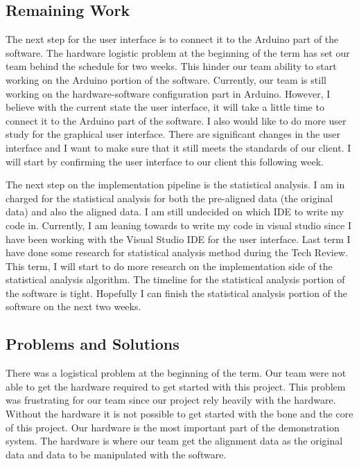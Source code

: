 \subsection{Remaining Work}
The next step for the user interface is to connect it to the Arduino part of the software. The hardware logistic problem at the beginning of the term has set our team behind the schedule for two weeks. This hinder our team ability to start working on the Arduino portion of the software. Currently, our team is still working on the hardware-software configuration part in Arduino. However, I believe with the current state the user interface, it will take a little time to connect it to the Arduino part of the software. I also would like to do more user study for the graphical user interface. There are significant changes in the user interface and I want to make sure that it still meets the standards of our client. I will start by confirming the user interface to our client this following week.

The next step on the implementation pipeline is the statistical analysis. I am in charged for the statistical analysis for both the pre-aligned data (the original data) and also the aligned data. I am still undecided on which IDE to write my code in. Currently, I am leaning towards to write my code in visual studio since I have been working with the Visual Studio IDE for the user interface. Last term I have done some research for statistical analysis method during the Tech Review. This term, I will start to do more research on the implementation side of the statistical analysis algorithm. The timeline for the statistical analysis portion of the software is tight. Hopefully I can finish the statistical analysis portion of the software on the next two weeks. 

\newpage
\subsection{Problems and Solutions}
There was a logistical problem at the beginning of the term. Our team were not able to get the hardware required to get started with this project. This problem was frustrating for our team since our project rely heavily with the hardware. Without the hardware it is not possible to get started with the bone and the core of this project. Our hardware is the most important part of the demonstration system. The hardware is where our team get the alignment data as the original data and data to be manipulated with the software.\\

